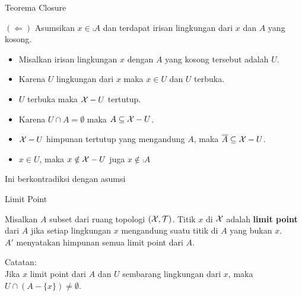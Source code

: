 \begin{frame}{Teorema Closure} 
    \begin{tcolorbox}[enhanced,title=Teorema 1.19 (Bukti), frame style tile={width=\paperwidth}{\wallpaper}]
        $(\Leftarrow)$ Asumsikan $x\in \comp{A}$ dan terdapat irisan lingkungan dari $x$ dan $A$ yang kosong.
        \begin{itemize}
            \item Misalkan irisan lingkungan $x$ dengan $A$ yang kosong tersebut adalah $U$.
            \item Karena $U$ lingkungan dari $x$ maka $x \in U$ dan $U$ terbuka.
            \item $U$ terbuka maka $\mathcal{X}-U$ tertutup.
            \item Karena $U \cap A = \emptyset$ maka $A\subseteq \mathcal{X}-U$.
            \item $\mathcal{X}-U$ himpunan tertutup yang mengandung $A$, maka $\overline{A}\subseteq \mathcal{X}-U$.
            \item $x \in U$, maka $x \notin \mathcal{X}-U$ juga $x\notin \comp{A}$
        \end{itemize}
        Ini berkontradiksi dengan asumsi
    \end{tcolorbox}
\end{frame}

\begin{frame}{Limit Point}
    \begin{tcolorbox}[enhanced,title=Definisi, frame style tile={width=\paperwidth}{\wallpaper}]
        Misalkan $A$ subset dari ruang topologi $(\mathcal{X},\mathcal{T})$. Titik $x$ di $\mathcal{X}$ adalah
        \textbf{limit point} dari $A$ jika setiap lingkungan $x$ mengandung suatu titik di $A$ yang bukan $x$.\\
        $A'$ menyatakan himpunan semua limit point dari $A$.
    \end{tcolorbox}
Catatan:\\
Jika $x$ limit point dari $A$ dan $U$ sembarang lingkungan dari $x$, maka
$U \cap (A-\{x\})\neq\emptyset$.
\end{frame}

